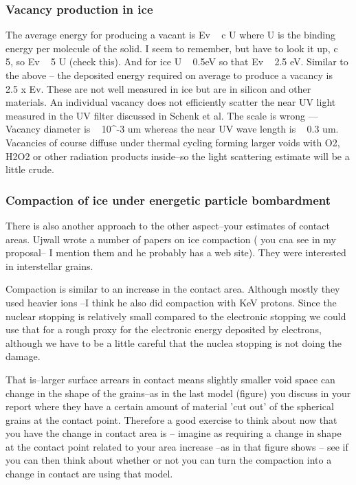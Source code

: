 \documentclass[11pt]{article} %
\begin{document}
\subsubsection{Vacancy production in ice}
	The average energy for producing a vacant is Ev ~ c U where U is the binding energy per molecule of the solid. I seem to remember, but have to look it up, c~ 5, so Ev ~ 5  U (check this). And for ice U ~ 0.5eV  so that Ev ~ 2.5 eV. Similar to the above -- the deposited energy required on average to produce a vacancy is ~ 2.5 x Ev. These are not well measured in ice but are in silicon and other materials.
	An individual vacancy does not efficiently scatter the near UV light measured in the UV filter discussed in Schenk et al. The scale is wrong --- Vacancy diameter  is  ~ 10^-3 um whereas the near UV wave length is  ~ 0.3 um. Vacancies of course diffuse under thermal cycling forming larger voids with O2, H2O2 or other radiation products inside--so the light scattering estimate will be a little crude. 
	
\subsubsection{Compaction of ice under energetic particle bombardment}

There is also another approach to the other aspect--your estimates of contact areas. Ujwall wrote a number of papers on ice compaction ( you cna see in my proposal-- I mention them and he probably has a web site). They were interested in interstellar grains.

Compaction is similar to an increase in the contact area. Although mostly they  used heavier ions --I think he also did compaction with KeV protons. Since the nuclear stopping is relatively small compared to the electronic stopping we could use that for a rough proxy for the electronic energy deposited by electrons, although we have to be a little careful that the nuclea stopping is not doing the damage.

That is--larger surface arrears in contact means slightly smaller void space can change in the shape of the grains--as in the last model (figure) you discuss in your report where they have a certain amount of material 'cut out' of the spherical grains at the contact point. Therefore a good exercise to think about now that you have the change in contact area is -- imagine as requiring a change in shape at the contact point related to your area increase --as in that figure shows -- see if you can then think about whether or not you can turn the compaction into a change in contact are using that model.
	
\end{document}
